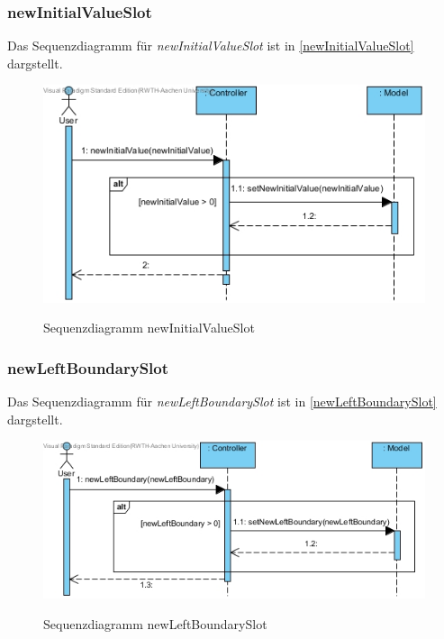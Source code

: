 \subsubsection*{newInitialValueSlot}

Das Sequenzdiagramm für \emph{newInitialValueSlot} ist in \ref{newInitialValueSlot} dargstellt.

\begin{figure}[H]
	\centering
	\includegraphics[scale=.6]{Bilder/Controller__newInitialValueSlot().jpg}\\
	\caption{Sequenzdiagramm newInitialValueSlot}
	\label{Sequenzdiagramm newInitialValueSlot}
\end{figure}

\subsubsection*{newLeftBoundarySlot}

Das Sequenzdiagramm für \emph{newLeftBoundarySlot} ist in \ref{newLeftBoundarySlot} dargstellt.

\begin{figure}[H]
	\centering
	\includegraphics[scale=.6]{Bilder/Controller__newLeftBoundarySlot().jpg}\\
	\caption{Sequenzdiagramm newLeftBoundarySlot}
	\label{Sequenzdiagramm newLeftBoundarySlot}
\end{figure}

